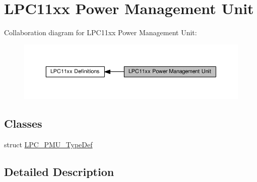 \hypertarget{group___l_p_c11xx___p_m_u}{}\section{L\+P\+C11xx Power Management Unit}
\label{group___l_p_c11xx___p_m_u}
Collaboration diagram for L\+P\+C11xx Power Management Unit\+:\nopagebreak
\begin{figure}[H]
\begin{center}
\leavevmode
\includegraphics[width=350pt]{group___l_p_c11xx___p_m_u}
\end{center}
\end{figure}
\subsection*{Classes}
\begin{DoxyCompactItemize}
\item 
struct \hyperlink{struct_l_p_c___p_m_u___type_def}{L\+P\+C\+\_\+\+P\+M\+U\+\_\+\+Type\+Def}
\end{DoxyCompactItemize}


\subsection{Detailed Description}
